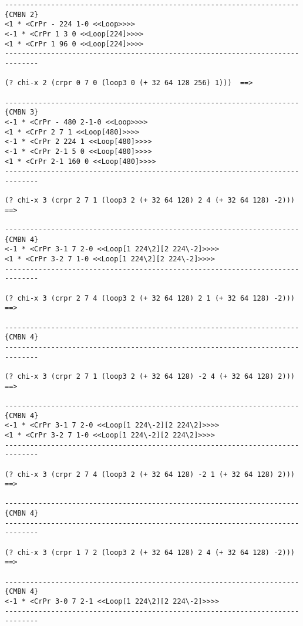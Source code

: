 {\begin{verbatim}
----------------------------------------------------------------------{CMBN 2}
<1 * <CrPr - 224 1-0 <<Loop>>>>
<-1 * <CrPr 1 3 0 <<Loop[224]>>>>
<1 * <CrPr 1 96 0 <<Loop[224]>>>>
------------------------------------------------------------------------------

(? chi-x 2 (crpr 0 7 0 (loop3 0 (+ 32 64 128 256) 1)))  ==>

----------------------------------------------------------------------{CMBN 3}
<-1 * <CrPr - 480 2-1-0 <<Loop>>>>
<1 * <CrPr 2 7 1 <<Loop[480]>>>>
<-1 * <CrPr 2 224 1 <<Loop[480]>>>>
<-1 * <CrPr 2-1 5 0 <<Loop[480]>>>>
<1 * <CrPr 2-1 160 0 <<Loop[480]>>>>
------------------------------------------------------------------------------

(? chi-x 3 (crpr 2 7 1 (loop3 2 (+ 32 64 128) 2 4 (+ 32 64 128) -2)))  ==>

----------------------------------------------------------------------{CMBN 4}
<-1 * <CrPr 3-1 7 2-0 <<Loop[1 224\2][2 224\-2]>>>>
<1 * <CrPr 3-2 7 1-0 <<Loop[1 224\2][2 224\-2]>>>>
------------------------------------------------------------------------------

(? chi-x 3 (crpr 2 7 4 (loop3 2 (+ 32 64 128) 2 1 (+ 32 64 128) -2)))  ==>

----------------------------------------------------------------------{CMBN 4}
------------------------------------------------------------------------------

(? chi-x 3 (crpr 2 7 1 (loop3 2 (+ 32 64 128) -2 4 (+ 32 64 128) 2)))  ==>

----------------------------------------------------------------------{CMBN 4}
<-1 * <CrPr 3-1 7 2-0 <<Loop[1 224\-2][2 224\2]>>>>
<1 * <CrPr 3-2 7 1-0 <<Loop[1 224\-2][2 224\2]>>>>
------------------------------------------------------------------------------

(? chi-x 3 (crpr 2 7 4 (loop3 2 (+ 32 64 128) -2 1 (+ 32 64 128) 2)))  ==>

----------------------------------------------------------------------{CMBN 4}
------------------------------------------------------------------------------

(? chi-x 3 (crpr 1 7 2 (loop3 2 (+ 32 64 128) 2 4 (+ 32 64 128) -2)))  ==>

----------------------------------------------------------------------{CMBN 4}
<-1 * <CrPr 3-0 7 2-1 <<Loop[1 224\2][2 224\-2]>>>>
------------------------------------------------------------------------------


\end{verbatim}}
